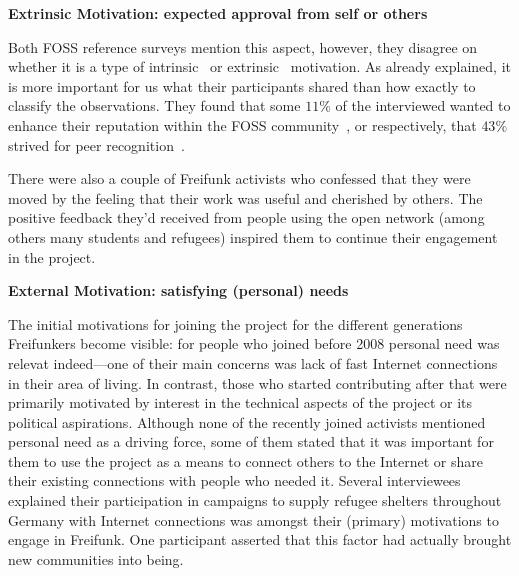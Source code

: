 \textbf{Extrinsic Motivation: expected approval from self or others}

Both FOSS reference surveys mention this aspect, however, they disagree on whether it is a type of intrinsic~\cite{LakWo2005} or extrinsic~\cite{HarOu2002} motivation.
As already explained, it is more important for us what their participants shared than how exactly to classify the observations.
They found that some $11\%$ of the interviewed wanted to enhance their reputation within the FOSS community~\cite{LakWo2005}, or respectively, that $43\%$ strived for peer recognition~\cite{HarOu2002}.

There were also a couple of Freifunk activists who confessed that they were moved by the feeling that their work was useful and cherished by others.
The positive feedback they'd received from people using the open network (among others many students and refugees) inspired them to continue their engagement in the project.


\textbf{External Motivation: satisfying (personal) needs}

The initial motivations for joining the project for the different generations Freifunkers become visible:
for people who joined before 2008 personal need was relevat indeed---one of their main concerns was lack of fast Internet connections in their area of living.
In contrast, those who started contributing after that were primarily motivated by interest in the technical aspects of the project or its political aspirations.
Although none of the recently joined activists mentioned personal need as a driving force,
some of them stated that it was important for them to use the project as a means to connect others to the Internet or share their existing connections with people who needed it.
Several interviewees explained their participation in campaigns to supply refugee shelters throughout Germany with Internet connections was amongst their (primary) motivations to engage in Freifunk.
One participant asserted that this factor had actually brought new communities into being.

